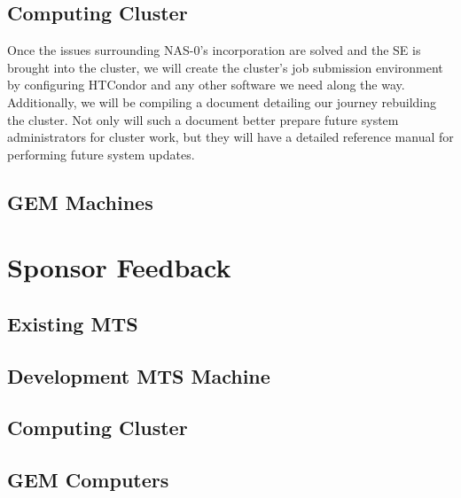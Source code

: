 \documentclass[12pt]{article}
\newcommand\tab[1][1cm]{\hspace*{#1}}
\begin{document}
\subsection{Computing Cluster}

\tab Once the issues surrounding NAS-0's incorporation are solved and the SE is
brought into the cluster, we will create the cluster's job submission
environment by configuring HTCondor and any other software we need along the
way. Additionally, we will be compiling a document detailing our journey
rebuilding the cluster. Not only will such a document better prepare future
system administrators for cluster work, but they will have a detailed reference
manual for performing future system updates.

\subsection{GEM Machines}

\tab 

\section{Sponsor Feedback}

\subsection{Existing MTS}

\vspace{1in}

\subsection{Development MTS Machine}

\vspace{1in}

\subsection{Computing Cluster}

\vspace{1in}

\subsection{GEM Computers}

\vspace{1in}

\newpage
\end{document}
